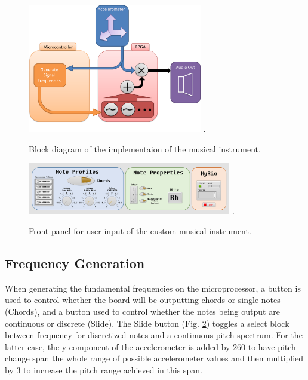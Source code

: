\begin{figure}[!t]
\centering
\includegraphics[width=3in]{part1blockdiagram.png}
\DeclareGraphicsExtensions.
\caption{Block diagram of the implementaion of the musical instrument.}
\label{fig_p1block}
\end{figure} 

\begin{figure}[!t]
\centering
\includegraphics[width=3.5in]{instrumentfrontpanel.png}
\DeclareGraphicsExtensions.
\caption{Front panel for user input of the custom musical instrument.}
\label{fig_p1front}
\end{figure} 


\subsection{Frequency Generation}

When generating the fundamental frequencies on the microprocessor, a button is used to control whether the board will be outputting chords or single notes (Chords), and a button used to control whether the notes being output are continuous or discrete (Slide).
 The Slide button (Fig. \ref{fig_p1front}) toggles a select block between frequency for discretized notes and a continuous pitch spectrum. For the latter case, the y-component of the accelerometer is added by 260 to have pitch change span the whole range of possible accelerometer values and then multiplied by 3 to increase the pitch range achieved in this span.

